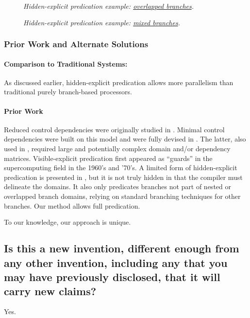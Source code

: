 \documentclass[10pt,dvips]{article}
\begin{document}
\begin{figure}
\centering
{}
\caption{{\em Hidden-explicit predication example: \underline{overlapped branches}.} }
\label{predex_o}
\end{figure}

\begin{figure}
\centering
{}
\caption{{\em Hidden-explicit predication example: \underline{mixed branches}.} }
\label{predex_c}
\end{figure}

\subsubsection{Prior Work and Alternate Solutions}
\label{priorwork}
\paragraph{Comparison to Traditional Systems: }
As discussed earlier, hidden-explicit predication allows more parallelism than
traditional purely branch-based processors. 

\paragraph{Prior Work}
Reduced control dependencies were originally studied in \cite{Tjaden72}.
Minimal control dependencies were built on this model and were fully devised in
\cite{Uht85c,Uht86,Uht91}. The latter, also used in \cite{Uht95}, required
large and potentially complex domain and/or dependency matrices.
Visible-explicit predication first appeared
as ``guards''
in the supercomputing field in the 1960's and '70's.
A limited form
of hidden-explicit predication is presented in \cite{Klauser98}, but it is not
truly hidden in that the compiler must delineate the domains. It also only
predicates branches 
not part of nested or overlapped branch domains,
relying on standard branching techniques
for other branches. Our method allows full predication.

To our knowledge, our approach is unique. 





\subsection{Is this a new invention, different enough from any other invention,
including any that you may have previously disclosed, that it will carry new
claims?}
Yes. 
\end{document}
